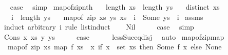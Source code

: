 \begin{isabellebody}
\ \isamarkupfalse%
\ {\isacharquery}{\kern0pt}case\ \isamarkupfalse%
\ simp\isanewline
{}\isamarkupfalse%
%
\endisatagproof
{\isafoldproof}%
%
\isadelimproof
\isanewline
%
\endisadelimproof
\isanewline
{}\isamarkupfalse%
\ map{\isacharunderscore}{\kern0pt}of{\isacharunderscore}{\kern0pt}zip{\isacharunderscore}{\kern0pt}nth{\isacharcolon}{\kern0pt}\isanewline
\ \ \ {\isachardoublequoteopen}length\ xs\ {\isacharequal}{\kern0pt}\ length\ ys{\isachardoublequoteclose}\isanewline
\ \ \ {\isachardoublequoteopen}distinct\ xs{\isachardoublequoteclose}\isanewline
\ \ \ {\isachardoublequoteopen}i\ {\isacharless}{\kern0pt}\ length\ ys{\isachardoublequoteclose}\isanewline
\ \ \ {\isachardoublequoteopen}map{\isacharunderscore}{\kern0pt}of\ {\isacharparenleft}{\kern0pt}zip\ xs\ ys{\isacharparenright}{\kern0pt}\ {\isacharparenleft}{\kern0pt}xs\ {\isacharbang}{\kern0pt}\ i{\isacharparenright}{\kern0pt}\ {\isacharequal}{\kern0pt}\ Some\ {\isacharparenleft}{\kern0pt}ys\ {\isacharbang}{\kern0pt}\ i{\isacharparenright}{\kern0pt}{\isachardoublequoteclose}\isanewline
%
\isadelimproof
%
\endisadelimproof
%
\isatagproof
{}\isamarkupfalse%
\ assms\ \isamarkupfalse%
\ {\isacharparenleft}{\kern0pt}induct\ arbitrary{\isacharcolon}{\kern0pt}\ i\ rule{\isacharcolon}{\kern0pt}\ list{\isacharunderscore}{\kern0pt}induct{}{\isacharparenright}{\kern0pt}\isanewline
\ \ \isamarkupfalse%
\ Nil\isanewline
\ \ \isamarkupfalse%
\ \isamarkupfalse%
\ {\isacharquery}{\kern0pt}case\ \isamarkupfalse%
\ simp\isanewline
{}\isamarkupfalse%
\isanewline
\ \ \isamarkupfalse%
\ {\isacharparenleft}{\kern0pt}Cons\ x\ xs\ y\ ys{\isacharparenright}{\kern0pt}\isanewline
\ \ \isamarkupfalse%
\ \isamarkupfalse%
\ {\isacharquery}{\kern0pt}case\isanewline
\ \ \ \ \isamarkupfalse%
\ less{\isacharunderscore}{\kern0pt}Suc{\isacharunderscore}{\kern0pt}eq{\isacharunderscore}{\kern0pt}{}{\isacharunderscore}{\kern0pt}disj\ \isamarkupfalse%
\ auto\isanewline
{}\isamarkupfalse%
%
\endisatagproof
{\isafoldproof}%
%
\isadelimproof
\isanewline
%
\endisadelimproof
\isanewline
{}\isamarkupfalse%
\ map{\isacharunderscore}{\kern0pt}of{\isacharunderscore}{\kern0pt}zip{\isacharunderscore}{\kern0pt}map{\isacharcolon}{\kern0pt}\isanewline
\ \ {\isachardoublequoteopen}map{\isacharunderscore}{\kern0pt}of\ {\isacharparenleft}{\kern0pt}zip\ xs\ {\isacharparenleft}{\kern0pt}map\ f\ xs{\isacharparenright}{\kern0pt}{\isacharparenright}{\kern0pt}\ {\isacharequal}{\kern0pt}\ {\isacharparenleft}{\kern0pt}{\isasymlambda}x{\isachardot}{\kern0pt}\ if\ x\ {\isasymin}\ set\ xs\ then\ Some\ {\isacharparenleft}{\kern0pt}f\ x{\isacharparenright}{\kern0pt}\ else\ None{\isacharparenright}{\kern0pt}{\isachardoublequoteclose}\isanewline

\end{isabellebody}
